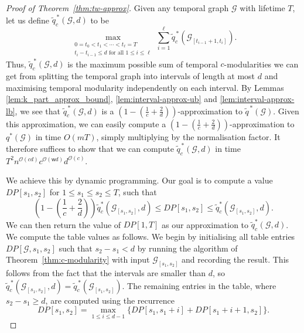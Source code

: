 \documentclass[runningheads]{llncs}
\newcommand{\cG}{\mathcal{G}}
\newcommand{\w}{\mathsf{w}}
\begin{document}
\begin{proof}[Proof of Theorem~\ref{thm:tw-approx}]
Given any temporal graph $\cG$ with lifetime $T$, let us define $\widetilde{q}^{\,*}_c(\cG,d)$ to be
$$ \max_{\substack{0=t_0 < t_1 < \cdots < t_{\ell} = T \\ t_i - t_{i-1} \leq d \text{ for all } 1 \leq i \leq \ell}} \sum_{i=1}^{\ell} \widetilde{q}^{\,*}_c(\cG_{[t_{i-1}+1,t_i]}). $$
Thus, $\widetilde{q}^{\,*}_c(\cG,d)$ is the maximum possible sum of temporal $c$-modularities we can get from splitting the temporal graph into intervals of length at most $d$ and maximising temporal modularity independently on each interval. 
 By Lemmas \ref{lem:k_part_approx_bound}, \ref{lem:interval-approx-ub} and \ref{lem:interval-approx-lb}, we see that $\widetilde{q}^{\,*}_c(\cG,d)$ is a $(1-(\frac{1}{c}+\frac{2}{d}))$-approximation to $\widetilde{q}^{\,*}(\cG)$.  Given this approximation, we can easily compute a $(1-(\frac{1}{c}+\frac{2}{d}))$-approximation to $q^*(\cG)$ in time $O(mT)$, simply multiplying by the normalisation factor. It therefore suffices to show that we can compute $\widetilde{q}^{\,*}_c(\cG,d)$ in time $T^2n^{\mathcal{O}(cd)}c^{\mathcal{O}(\w d)}d^{\mathcal{O}(c)}$.
 
    We achieve this by dynamic programming.  Our goal is to compute a value $DP[s_1,s_2]$ for $1 \leq s_1 \leq s_2 \leq T$, such that 
    \begin{equation}
    \left(1-(\frac{1}{c}+\frac{2}{d})\right) \widetilde{q}_c^*(\cG_{[s_1,s_2]},d) \leq DP[s_1,s_2] \leq \widetilde{q}_c^*(\cG_{[s_1,s_2]},d).
    \label{eqn:DP-approx-bounds}
    \end{equation}
    We can then return the value of $DP[1,T]$ as our approximation to $\widetilde{q}_c^*(\cG,d)$.  We compute the table values as follows.
    We begin by initialising all table entries $DP[\cG,s_1,s_2]$ such that $s_2 - s_1 < d$ by running the algorithm of Theorem~\ref{thm:c-modularity} with input $\cG_{[s_1,s_2]}$ and recording the result.
    This follows from the fact that the intervals are smaller than $d$, so $\widetilde{q}^{\,*}_c(\cG_{[s_1,s_2]},d)=\widetilde{q}^{\,*}_c(\cG_{[s_1,s_2]})$.
    The remaining entries in the table, where $s_2 - s_1 \geq d$, are computed using the recurrence
    $$DP[s_1,s_2] = \max_{1 \leq i \leq d-1} \{ DP[s_1,s_1 + i] + DP[s_1+i+1,s_2]\}.$$


\end{proof}
\end{document}
